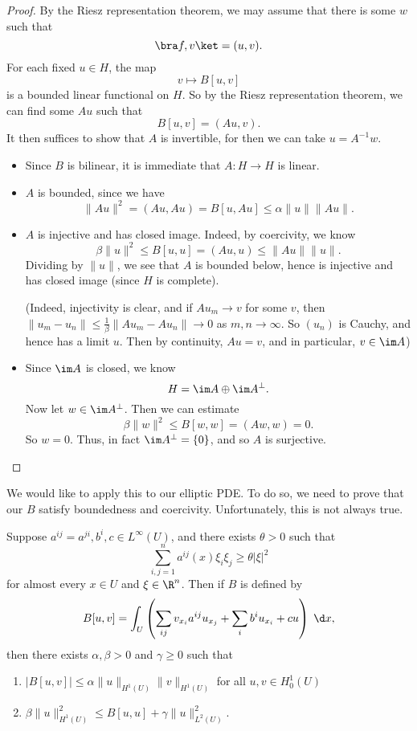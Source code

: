 \documentclass[a4paper]{article}
\begin{document}
\begin{proof}
  By the Riesz representation theorem, we may assume that there is some $w$ such that
  \[
    \bra f, v\ket = (u, v).
  \]
  For each fixed $u \in H$, the map
  \[
    v \mapsto B[u, v]
  \]
  is a bounded linear functional on $H$. So by the Riesz representation theorem, we can find some $Au$ such that
  \[
    B[u, v] = (Au, v).
  \]
  It then suffices to show that $A$ is invertible, for then we can take $u = A^{-1} w$.

  \begin{itemize}
    \item Since $B$ is bilinear, it is immediate that $A: H \to H$ is linear.
    \item $A$ is bounded, since we have
      \[
        \|Au\|^2 = (Au, Au) = B[u, Au]\leq \alpha \|u\| \|Au\|.
      \]
    \item $A$ is injective and has closed image. Indeed, by coercivity, we know
      \[
        \beta \|u\|^2 \leq B[u, u] = (Au, u) \leq \|A u\| \|u\|.
      \]
      Dividing by $\|u\|$, we see that $A$ is bounded below, hence is injective and has closed image (since $H$ is complete).

      (Indeed, injectivity is clear, and if $A u_m \to v$ for some $v$, then $\|u_m - u_n\| \leq \frac{1}{\beta} \|A u_m - A u_n\| \to 0$ as $m, n \to \infty$. So $(u_n)$ is Cauchy, and hence has a limit $u$. Then by continuity, $A u = v$, and in particular, $v \in \im A$)

    \item Since $\im A$ is closed, we know
      \[
        H = \im A \oplus \im A ^\perp.
      \]
      Now let $w \in \im A^\perp$. Then we can estimate
      \[
        \beta\|w\|^2 \leq B[w, w] = (Aw, w) = 0.
      \]
      So $w = 0$. Thus, in fact $\im A^\perp = \{0\}$, and so $A$ is surjective.\qedhere
 \end{itemize}
\end{proof}

We would like to apply this to our elliptic PDE. To do so, we need to prove that our $B$ satisfy boundedness and coercivity. Unfortunately, this is not always true.

\begin{thm}
  Suppose $a^{ij} = a^{ji}, b^i, c \in L^\infty(U)$, and there exists $\theta > 0$ such that
  \[
    \sum_{i, j = 1}^n a^{ij}(x) \xi_i \xi_j \geq \theta |\xi|^2
  \]
  for almost every $x \in U$ and $\xi \in \R^n$. Then if $B$ is defined by
  \[
    B[u, v] = \int_U \left(\sum_{ij} v_{x_i} a^{ij} u_{x_j} + \sum_i b^i u_{x_i} + c u\right)\;\d x,
  \]
  then there exists $\alpha, \beta > 0$ and $\gamma \geq 0$ such that
  \begin{enumerate}
    \item $|B[u, v]| \leq \alpha \|u\|_{H^1(U)} \|v\|_{H^1(U)}$ for all $u, v \in H_0^1(U)$
    \item $\beta\|u\|^2_{H^1(U)} \leq B[u, u] + \gamma \|u\|_{L^2(U)}^2$.
  \end{enumerate}
\end{thm}
\end{document}
